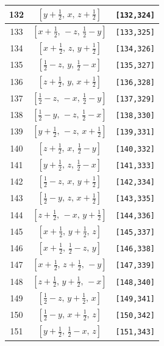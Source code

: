 \documentclass[fleqn,8pt]{jsarticle}
\begin{document}
\begin{longtable}{ccc}
132 & $\left[ y + \frac{1}{2},\, x,\, z + \frac{1}{2} \right]$ & {\tt [132,324]} \\ \hline
133 & $\left[ x + \frac{1}{2},\, - z,\, \frac{1}{2} - y \right]$ & {\tt [133,325]} \\ \hline
134 & $\left[ x + \frac{1}{2},\, z,\, y + \frac{1}{2} \right]$ & {\tt [134,326]} \\ \hline
135 & $\left[ \frac{1}{2} - z,\, y,\, \frac{1}{2} - x \right]$ & {\tt [135,327]} \\ \hline
136 & $\left[ z + \frac{1}{2},\, y,\, x + \frac{1}{2} \right]$ & {\tt [136,328]} \\ \hline
137 & $\left[ \frac{1}{2} - z,\, - x,\, \frac{1}{2} - y \right]$ & {\tt [137,329]} \\ \hline
138 & $\left[ \frac{1}{2} - y,\, - z,\, \frac{1}{2} - x \right]$ & {\tt [138,330]} \\ \hline
139 & $\left[ y + \frac{1}{2},\, - z,\, x + \frac{1}{2} \right]$ & {\tt [139,331]} \\ \hline
140 & $\left[ z + \frac{1}{2},\, x,\, \frac{1}{2} - y \right]$ & {\tt [140,332]} \\ \hline
141 & $\left[ y + \frac{1}{2},\, z,\, \frac{1}{2} - x \right]$ & {\tt [141,333]} \\ \hline
142 & $\left[ \frac{1}{2} - z,\, x,\, y + \frac{1}{2} \right]$ & {\tt [142,334]} \\ \hline
143 & $\left[ \frac{1}{2} - y,\, z,\, x + \frac{1}{2} \right]$ & {\tt [143,335]} \\ \hline
144 & $\left[ z + \frac{1}{2},\, - x,\, y + \frac{1}{2} \right]$ & {\tt [144,336]} \\ \hline
145 & $\left[ x + \frac{1}{2},\, y + \frac{1}{2},\, z \right]$ & {\tt [145,337]} \\ \hline
146 & $\left[ x + \frac{1}{2},\, \frac{1}{2} - z,\, y \right]$ & {\tt [146,338]} \\ \hline
147 & $\left[ x + \frac{1}{2},\, z + \frac{1}{2},\, - y \right]$ & {\tt [147,339]} \\ \hline
148 & $\left[ z + \frac{1}{2},\, y + \frac{1}{2},\, - x \right]$ & {\tt [148,340]} \\ \hline
149 & $\left[ \frac{1}{2} - z,\, y + \frac{1}{2},\, x \right]$ & {\tt [149,341]} \\ \hline
150 & $\left[ \frac{1}{2} - y,\, x + \frac{1}{2},\, z \right]$ & {\tt [150,342]} \\ \hline
151 & $\left[ y + \frac{1}{2},\, \frac{1}{2} - x,\, z \right]$ & {\tt [151,343]} \\ \hline

\end{longtable}
\end{document}

